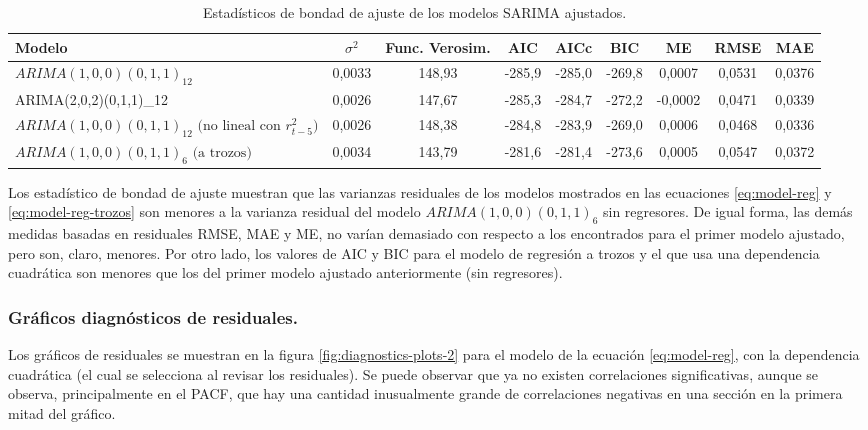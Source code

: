 \documentclass[]{article}
\begin{document}
\begin{table}

\caption{\label{tab:lagged-regression}Estadísticos de bondad de ajuste de los modelos SARIMA ajustados.}
\centering
\begin{tabular}[t]{l|c|c|c|c|c|c|c|c}
\hline
Modelo & $\sigma^2$ & Func. Verosim. & AIC & AICc & BIC & ME & RMSE & MAE\\
\hline
$ARIMA(1,0,0)(0,1,1)_12$ & 0,0033 & 148,93 & -285,9 & -285,0 & -269,8 & 0,0007 & 0,0531 & 0,0376\\
\hline
ARIMA(2,0,2)(0,1,1)_12 & 0,0026 & 147,67 & -285,3 & -284,7 & -272,2 & -0,0002 & 0,0471 & 0,0339\\
\hline
$ARIMA(1,0,0)(0,1,1)_12 \text{ (no lineal con }r_{t-5}^2\text{)}$ & 0,0026 & 148,38 & -284,8 & -283,9 & -269,0 & 0,0006 & 0,0468 & 0,0336\\
\hline
$ARIMA(1,0,0)(0,1,1)_6 \text{ (a trozos)}$ & 0,0034 & 143,79 & -281,6 & -281,4 & -273,6 & 0,0005 & 0,0547 & 0,0372\\
\hline
\end{tabular}
\end{table}

Los estadístico de bondad de ajuste muestran que las varianzas residuales de los modelos mostrados en las ecuaciones \eqref{eq:model-reg} y \eqref{eq:model-reg-trozos} son menores a la varianza residual del modelo \(ARIMA(1,0,0)(0,1,1)_6\) sin regresores.
De igual forma, las demás medidas basadas en residuales RMSE, MAE y ME, no varían demasiado con respecto a los encontrados para el primer modelo ajustado, pero son, claro, menores.
Por otro lado, los valores de AIC y BIC para el modelo de regresión a trozos y el que usa una dependencia cuadrática son menores que los del primer modelo ajustado anteriormente (sin regresores).

\hypertarget{gruxe1ficos-diagnuxf3sticos-de-residuales.-1}{%
\subsubsection{Gráficos diagnósticos de residuales.}\label{gruxe1ficos-diagnuxf3sticos-de-residuales.-1}}

Los gráficos de residuales se muestran en la figura \ref{fig:diagnostics-plots-2} para el modelo de la ecuación \eqref{eq:model-reg}, con la dependencia cuadrática (el cual se selecciona al revisar los residuales).
Se puede observar que ya no existen correlaciones significativas, aunque se observa, principalmente en el PACF, que hay una cantidad inusualmente grande de correlaciones negativas en una sección en la primera mitad del gráfico.
\end{document}
